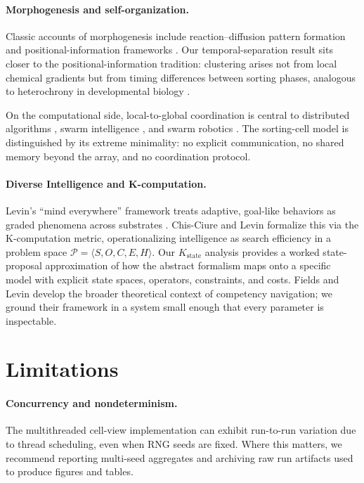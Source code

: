 \documentclass[11pt]{article}
\begin{document}
\paragraph{Morphogenesis and self-organization.}
Classic accounts of morphogenesis include reaction--diffusion pattern formation
\cite{turing1952chemical} and positional-information frameworks \cite{wolpert1969positional}.
Our temporal-separation result sits closer to the positional-information tradition: clustering
arises not from local chemical gradients but from timing differences between sorting phases,
analogous to heterochrony in developmental biology \cite{gould1977ontogeny}.

On the computational side, local-to-global coordination is central to distributed algorithms
\cite{lynch1996distributed}, swarm intelligence \cite{bonabeau1999swarm,couzin2009collective},
and swarm robotics \cite{rubenstein2014programmable,werfel2014designing}. The sorting-cell model is
distinguished by its extreme minimality: no explicit communication, no shared memory beyond the
array, and no coordination protocol.

\paragraph{Diverse Intelligence and K-computation.}
Levin's ``mind everywhere'' framework treats adaptive, goal-like behaviors as graded phenomena
across substrates \cite{levin2022technological}. Chis-Ciure and Levin \cite{chisciure2025cognition}
formalize this via the K-computation metric, operationalizing intelligence as search efficiency
in a problem space $\mathcal{P} = \langle S, O, C, E, H \rangle$. Our
$K_{\mathrm{state}}$ analysis provides a worked state-proposal approximation of how the abstract
formalism maps onto a specific model with explicit state spaces, operators, constraints, and costs.
Fields and Levin
\cite{fields2022competency} develop the broader theoretical context of competency navigation; we
ground their framework in a system small enough that every parameter is inspectable.

\section{Limitations}
\label{sec:limits}
\paragraph{Concurrency and nondeterminism.}
The multithreaded cell-view implementation can exhibit run-to-run variation due to thread scheduling,
even when RNG seeds are fixed. Where this matters, we recommend reporting multi-seed aggregates and
archiving raw run artifacts used to produce figures and tables.
\end{document}
